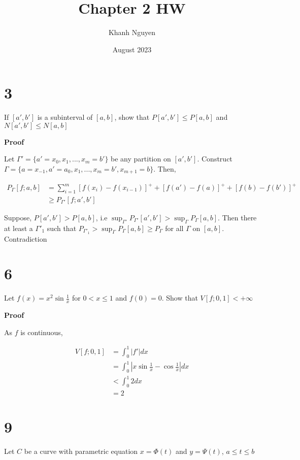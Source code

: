 \documentclass{article}
\title{
    Chapter 2 HW
}
\author{Khanh Nguyen}
\date{August 2023}
\begin{document}
\maketitle

\section*{3}

If $[a', b']$ is a subinterval of $[a, b]$, show that $P[a', b'] \leq P[a, b]$ and $N[a', b'] \leq N[a, b]$

\textbf{Proof}

Let $\Gamma' = \{a' = x_0, x_1, ..., x_m = b' \}$ be any partition on $[a', b']$. Construct $\Gamma = \{a = x_{-1}, a' = a_0, x_1, ..., x_m = b', x_{m+1} = b\}$. Then,

\begin{align*}
    P_\Gamma[f; a, b]
        &= \sum_{i=1}^m [f(x_i) - f(x_{i-1})]^+ + [f(a') - f(a)]^+ + [f(b) - f(b')]^+ \\
        &\geq P_{\Gamma'}[f; a', b']
\end{align*}

Suppose, $P[a', b'] > P[a, b]$, i.e $\sup_{\Gamma'} P_{\Gamma'}[a', b'] > \sup_\Gamma P_\Gamma[a, b]$. Then there at least a $\Gamma'_1$ such that $P_{\Gamma'_1} > \sup_\Gamma P_\Gamma[a, b] \geq P_\Gamma$ for all $\Gamma$ on $[a, b]$. Contradiction


\section*{6}

Let $f(x) = x^2 \sin \frac{1}{x}$ for $0 < x \leq 1$ and $f(0) = 0$. Show that $V[f; 0, 1] < +\infty$

\textbf{Proof}

As $f$ is continuous,

\begin{align*}
    V[f; 0, 1]
        &= \int_0^1 |f'| dx \\
        &= \int_0^1 \left| x \sin \frac{1}{x} - \cos \frac{1}{x} \right| dx \\
        &< \int_0^1 2 dx \\
        &= 2
\end{align*}


\section*{9}

Let $C$ be a curve with parametric equation $x = \Phi(t)$ and $y = \Psi(t)$, $a \leq t \leq b$
\end{document}
